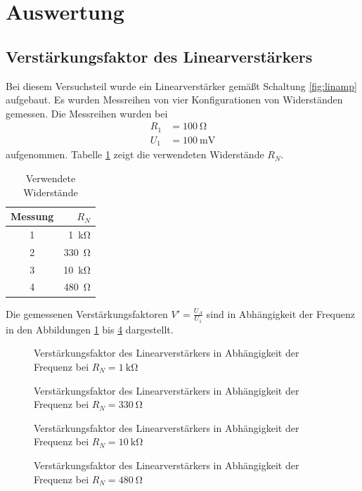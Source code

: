 \section{Auswertung}

\subsection{Verstärkungsfaktor des Linearverstärkers}

Bei diesem Versuchsteil wurde ein Linearverstärker gemäßt Schaltung \ref{fig:linamp} aufgebaut.
Es wurden Messreihen von vier Konfigurationen von Widerständen gemessen.
Die Messreihen wurden bei
\begin{align}
	R_1 &= \SI{100}{\ohm} \\
	U_1 &= \SI{100}{\milli \volt}
\end{align}
aufgenommen.
Tabelle \ref{tab:rn} zeigt die verwendeten Widerstände $R_N$.
\begin{table}
	\centering
	\begin{tabular}{c r}
		\toprule
		Messung & $R_N$ \\
		\midrule
		1 & \SI{1}{\kilo \ohm} \\
		2 & \SI{330}{\ohm} \\
		3 & \SI{10}{\kilo \ohm} \\
		4 & \SI{480}{\ohm} \\
		\bottomrule
	\end{tabular}
	\caption{Verwendete Widerstände}
	\label{tab:rn}
\end{table}
Die gemessenen Verstärkungsfaktoren $V' = \frac{U_A}{U_1}$ sind in Abhängigkeit der Frequenz in den Abbildungen \ref{fig:lin1} bis \ref{fig:lin4} dargestellt.
\begin{figure}
	\centering
	\resizebox{\pltwidth}{!}{
		
	}
	\caption{Verstärkungsfaktor des Linearverstärkers in Abhängigkeit der Frequenz bei $R_N = \SI{1}{\kilo \ohm}$}
	\label{fig:lin1}
\end{figure}
\begin{figure}
	\centering
	\resizebox{\pltwidth}{!}{
		
	}
	\caption{Verstärkungsfaktor des Linearverstärkers in Abhängigkeit der Frequenz bei $R_N = \SI{330}{\ohm}$}
	\label{fig:lin2}
\end{figure}
\begin{figure}
	\centering
	\resizebox{\pltwidth}{!}{
		
	}
	\caption{Verstärkungsfaktor des Linearverstärkers in Abhängigkeit der Frequenz bei $R_N = \SI{10}{\kilo \ohm}$}
	\label{fig:lin3}
\end{figure}
\begin{figure}
	\centering
	\resizebox{\pltwidth}{!}{
		
	}
	\caption{Verstärkungsfaktor des Linearverstärkers in Abhängigkeit der Frequenz bei $R_N = \SI{480}{\ohm}$}
	\label{fig:lin4}
\end{figure}


